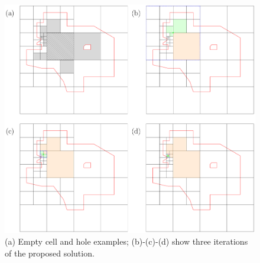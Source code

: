 \begin{figure}
    \centering
    \includegraphics[width=\linewidth]{chapterSDCEL/orphan_cells.pdf}    
    \caption{(a) Empty cell and hole examples; (b)-(c)-(d) show three iterations of the proposed solution.} \label{fig:orphan_cells}
\end{figure}



